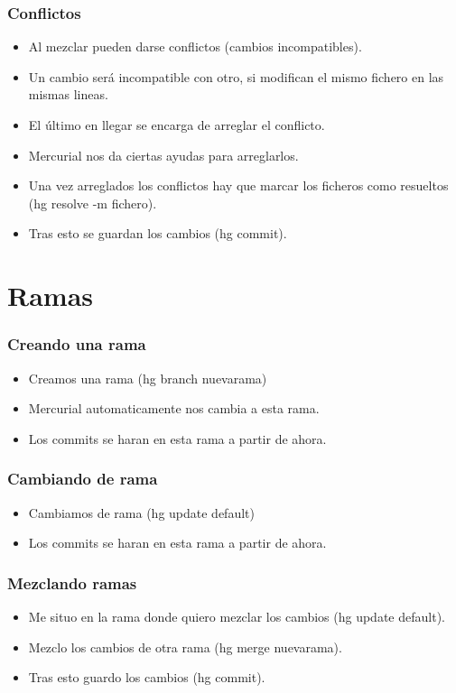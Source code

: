 \documentclass[10pt]{beamer}
\begin{document}
  \begin{frame}[containsverbatim]
    \frametitle{Conflictos}
    \begin{itemize}
      \item Al mezclar pueden darse conflictos (cambios incompatibles).
      \item Un cambio será incompatible con otro, si modifican el mismo fichero en las mismas lineas.
      \item El último en llegar se encarga de arreglar el conflicto.
      \item Mercurial nos da ciertas ayudas para arreglarlos.
      \item Una vez arreglados los conflictos hay que marcar los ficheros como resueltos (hg resolve -m fichero).
      \item Tras esto se guardan los cambios (hg commit).
    \end{itemize}
  \end{frame}

  \section*{Ramas}

  \begin{frame}[containsverbatim]
    \frametitle{Creando una rama}
    \begin{itemize}
      \item Creamos una rama (hg branch nuevarama)
      \item Mercurial automaticamente nos cambia a esta rama.
      \item Los commits se haran en esta rama a partir de ahora.
    \end{itemize}
  \end{frame}

  \begin{frame}[containsverbatim]
    \frametitle{Cambiando de rama}
    \begin{itemize}
      \item Cambiamos de rama (hg update default)
      \item Los commits se haran en esta rama a partir de ahora.
    \end{itemize}
  \end{frame}

  \begin{frame}[containsverbatim]
    \frametitle{Mezclando ramas}
    \begin{itemize}
      \item Me situo en la rama donde quiero mezclar los cambios (hg update default).
      \item Mezclo los cambios de otra rama (hg merge nuevarama).
      \item Tras esto guardo los cambios (hg commit).
    \end{itemize}
  \end{frame}
\end{document}
